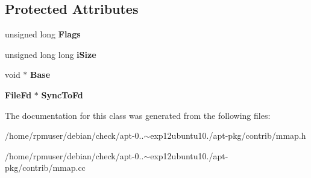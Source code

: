 \subsection*{\-Protected \-Attributes}
\begin{DoxyCompactItemize}
\item 
unsigned long {\bfseries \-Flags}\label{classMMap_a15eb852dd5568416ca012c6dcbff021b}

\item 
unsigned long long {\bfseries i\-Size}\label{classMMap_a7c1c34236f840245f42babe60ec41bb8}

\item 
void $\ast$ {\bfseries \-Base}\label{classMMap_accdd444e1dcba9a8ab17b65d51f12771}

\item 
{\bf \-File\-Fd} $\ast$ {\bfseries \-Sync\-To\-Fd}\label{classMMap_a6de0b37236933b43702cb3a24d0748c6}

\end{DoxyCompactItemize}


\-The documentation for this class was generated from the following files\-:\begin{DoxyCompactItemize}
\item 
/home/rpmuser/debian/check/apt-\/0..$\sim$exp12ubuntu10./apt-\/pkg/contrib/mmap.\-h\item 
/home/rpmuser/debian/check/apt-\/0..$\sim$exp12ubuntu10./apt-\/pkg/contrib/mmap.\-cc\end{DoxyCompactItemize}
